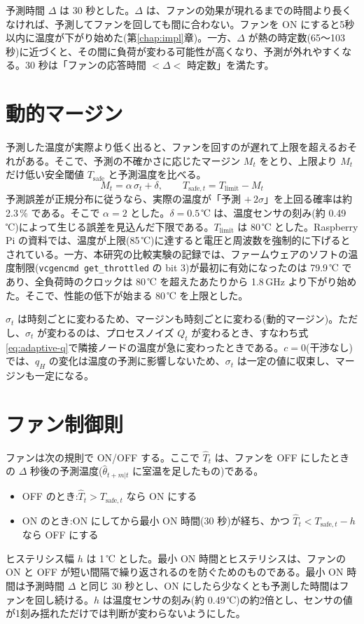 予測時間 $\Delta$ は 30 秒とした。$\Delta$ は、ファンの効果が現れるまでの時間より長くなければ、予測してファンを回しても間に合わない。ファンを ON にすると5秒以内に温度が下がり始めた(第\ref{chap:impl}章)。一方、$\Delta$ が熱の時定数(65〜103 秒)に近づくと、その間に負荷が変わる可能性が高くなり、予測が外れやすくなる。30 秒は「ファンの応答時間 $< \Delta <$ 時定数」を満たす。

\section{動的マージン}\label{sec:method-margin}
予測した温度が実際より低く出ると、ファンを回すのが遅れて上限を超えるおそれがある。そこで、予測の不確かさに応じたマージン $M_t$ をとり、上限より $M_t$ だけ低い安全閾値 $T_{\mathrm{safe}}$ と予測温度を比べる。
\begin{equation}
  M_t = \alpha\,\sigma_t + \delta,\qquad T_{\mathrm{safe},t} = T_{\mathrm{limit}} - M_t
  \label{eq:margin}
\end{equation}
予測誤差が正規分布に従うなら、実際の温度が「予測 $+\,2\sigma$」を上回る確率は約 2.3\,\% である。そこで $\alpha = 2$ とした。$\delta = 0.5$\,℃ は、温度センサの刻み(約 0.49\,℃)によって生じる誤差を見込んだ下限である。$T_{\mathrm{limit}}$ は 80\,℃ とした。Raspberry Pi の資料では、温度が上限(85\,℃)に達すると電圧と周波数を強制的に下げるとされている\cite{rpi2026cooling}。一方、本研究の比較実験の記録では、ファームウェアのソフトの温度制限(\texttt{vcgencmd get\_throttled} の bit 3)が最初に有効になったのは 79.9\,℃ であり、全負荷時のクロックは 80\,℃ を超えたあたりから 1.8\,GHz より下がり始めた。そこで、性能の低下が始まる 80\,℃ を上限とした。

$\sigma_t$ は時刻ごとに変わるため、マージンも時刻ごとに変わる(動的マージン)。ただし、$\sigma_t$ が変わるのは、プロセスノイズ $Q_t$ が変わるとき、すなわち式\eqref{eq:adaptive-q}で隣接ノードの温度が急に変わったときである。$c = 0$(干渉なし)では、$q_H$ の変化は温度の予測に影響しないため、$\sigma_t$ は一定の値に収束し、マージンも一定になる。

\section{ファン制御則}\label{sec:method-control}
ファンは次の規則で ON/OFF する。ここで $\hat{T}_t$ は、ファンを OFF にしたときの $\Delta$ 秒後の予測温度($\hat{\theta}_{t+m|t}$ に室温を足したもの)である。
\begin{itemize}
  \item OFF のとき:$\hat{T}_t > T_{\mathrm{safe},t}$ なら ON にする
  \item ON のとき:ON にしてから最小 ON 時間(30 秒)が経ち、かつ $\hat{T}_t < T_{\mathrm{safe},t} - h$ なら OFF にする
\end{itemize}
ヒステリシス幅 $h$ は 1\,℃ とした。最小 ON 時間とヒステリシスは、ファンの ON と OFF が短い間隔で繰り返されるのを防ぐためのものである。最小 ON 時間は予測時間 $\Delta$ と同じ 30 秒とし、ON にしたら少なくとも予測した時間はファンを回し続ける。$h$ は温度センサの刻み(約 0.49\,℃)の約2倍とし、センサの値が1刻み揺れただけでは判断が変わらないようにした。
